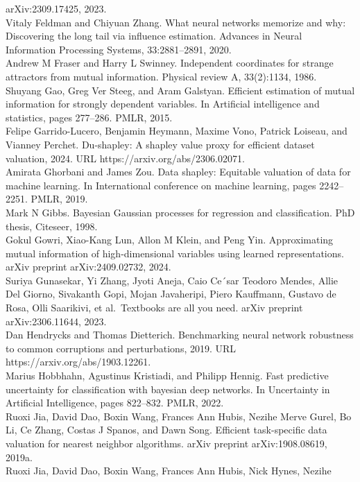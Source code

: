 arXiv:2309.17425, 2023.\\
Vitaly Feldman and Chiyuan Zhang. What neural networks memorize and why:
Discovering the long tail via influence estimation. Advances in Neural
Information Processing Systems, 33:2881--2891, 2020.\\
Andrew M Fraser and Harry L Swinney. Independent coordinates for strange
attractors from mutual information. Physical review A, 33(2):1134,
1986.\\
Shuyang Gao, Greg Ver Steeg, and Aram Galstyan. Efficient estimation of
mutual information for strongly dependent variables. In Artificial
intelligence and statistics, pages 277--286. PMLR, 2015.\\
Felipe Garrido-Lucero, Benjamin Heymann, Maxime Vono, Patrick Loiseau,
and Vianney Perchet. Du-shapley: A shapley value proxy for efficient
dataset valuation, 2024. URL https://arxiv.org/abs/2306.02071.\\
Amirata Ghorbani and James Zou. Data shapley: Equitable valuation of
data for machine learning. In International conference on machine
learning, pages 2242--2251. PMLR, 2019.\\
Mark N Gibbs. Bayesian Gaussian processes for regression and
classification. PhD thesis, Citeseer, 1998.\\
Gokul Gowri, Xiao-Kang Lun, Allon M Klein, and Peng Yin. Approximating
mutual information of high-dimensional variables using learned
representations. arXiv preprint arXiv:2409.02732, 2024.\\
Suriya Gunasekar, Yi Zhang, Jyoti Aneja, Caio Ce´sar Teodoro Mendes,
Allie Del Giorno, Sivakanth Gopi, Mojan Javaheripi, Piero Kauffmann,
Gustavo de Rosa, Olli Saarikivi, et al.~Textbooks are all you need.
arXiv preprint arXiv:2306.11644, 2023.\\
Dan Hendrycks and Thomas Dietterich. Benchmarking neural network
robustness to common corruptions and perturbations, 2019. URL
https://arxiv.org/abs/1903.12261.\\
Marius Hobbhahn, Agustinus Kristiadi, and Philipp Hennig. Fast
predictive uncertainty for classification with bayesian deep networks.
In Uncertainty in Artificial Intelligence, pages 822--832. PMLR, 2022.\\
Ruoxi Jia, David Dao, Boxin Wang, Frances Ann Hubis, Nezihe Merve Gurel,
Bo Li, Ce Zhang, Costas J Spanos, and Dawn Song. Efficient task-specific
data valuation for nearest neighbor algorithms. arXiv preprint
arXiv:1908.08619, 2019a.\\
Ruoxi Jia, David Dao, Boxin Wang, Frances Ann Hubis, Nick Hynes, Nezihe
